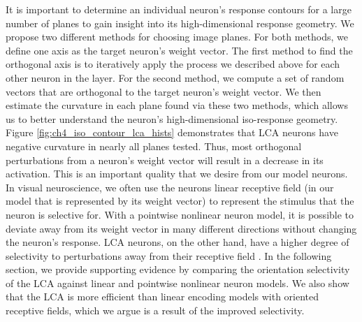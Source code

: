 It is important to determine an individual neuron's response contours for a large number of planes to gain insight into its high-dimensional response geometry.
We propose two different methods for choosing image planes.
For both methods, we define one axis as the target neuron's weight vector.
The first method to find the orthogonal axis is to iteratively apply the process we described above for each other neuron in the layer.
For the second method, we compute a set of random vectors that are orthogonal to the target neuron’s weight vector.
We then estimate the curvature in each plane found via these two methods, which allows us to better understand the neuron’s high-dimensional iso-response geometry.
Figure \ref{fig:ch4_iso_contour_lca_hists} demonstrates that LCA neurons have negative curvature in nearly all planes tested.
Thus, most orthogonal perturbations from a neuron's weight vector will result in a decrease in its activation.
This is an important quality that we desire from our model neurons.
In visual neuroscience, we often use the neurons linear receptive field (in our model that is represented by its weight vector) to represent the stimulus that the neuron is selective for.
With a pointwise nonlinear neuron model, it is possible to deviate away from its weight vector in many different directions without changing the neuron's response.
LCA neurons, on the other hand, have a higher degree of selectivity to perturbations away from their receptive field \parencite{vilankar2017selectivity}.
In the following section, we provide supporting evidence by comparing the orientation selectivity of the LCA against linear and pointwise nonlinear neuron models.
We also show that the LCA is more efficient than linear encoding models with oriented receptive fields, which we argue is a result of the improved selectivity.


